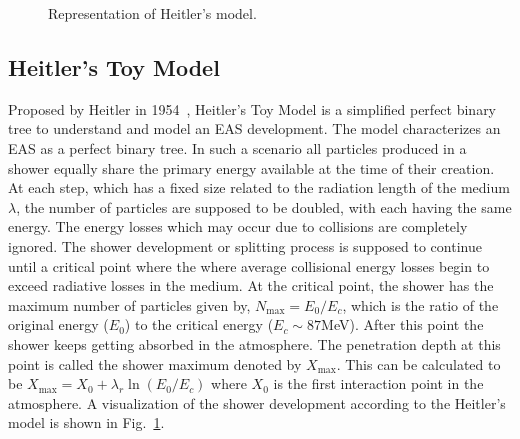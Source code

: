 \begin{figure}[t!]
    \centering
    \hfill
    \caption{Representation of Heitler's model.}
    \label{fig:EAS_toy_model}
\end{figure}

\subsection{Heitler's Toy Model}
\label{sec:Dev_Heitler}

Proposed by Heitler in 1954~\cite{heitler1984quantum}, Heitler's Toy Model is a simplified perfect binary tree to understand and model an EAS development. The model characterizes an EAS as a perfect binary tree. In such a scenario all particles produced in a shower equally share the primary energy available at the time of their creation. At each step, which has a fixed size related to the radiation length of the medium $\lambda$, the number of particles are supposed to be doubled, with each having the same energy. The energy losses which may occur due to collisions are completely ignored. The shower development or splitting process is supposed to continue until a critical point where the where average collisional energy losses begin to exceed radiative losses in the medium. At the critical point, the shower has the maximum number of particles given by, $N_{\text{max}} = E_0/E_c$, which is the ratio of the original energy ($E_0$) to the critical energy ($E_c \sim 87$MeV). After this point the shower keeps getting absorbed in the atmosphere. The penetration depth at this point is called the shower maximum denoted by $X_{\text{max}}$. This can be calculated to be $X_{\text{max}} = X_0 + \lambda_r \ln(E_0/E_c)$ where $X_0$ is the first interaction point in the atmosphere. A visualization of the shower development according to the Heitler's model is shown in Fig.~\ref{fig:EAS_toy_model}.

